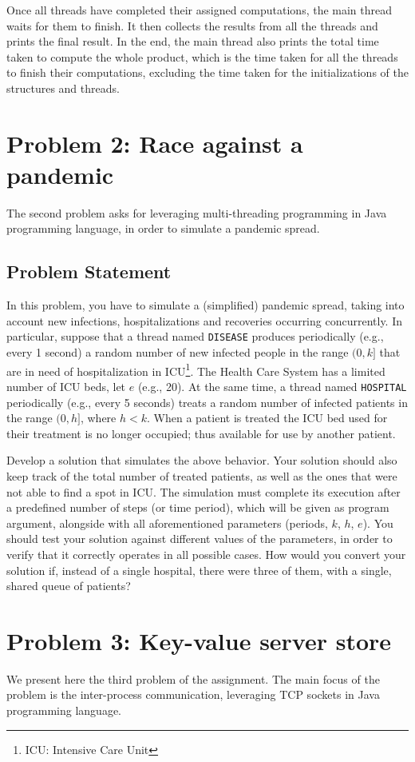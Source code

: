 \documentclass[acmlarge]{acmart}
\newcommand{\disease}{{\small \texttt{DISEASE}} }
\newcommand{\hospital}{{\small \texttt{HOSPITAL}} }
\begin{document}
Once all threads have completed their assigned computations, the main thread waits for them to finish. It then collects the results from all the threads and prints the final result. In the end, the main thread also prints the total time taken to compute the whole product, which is the time taken for all the threads to finish their computations, excluding the time taken for the initializations of the structures and threads.


\section{Problem 2: Race against a pandemic}
\label{section:problem2}
The second problem asks for leveraging multi-threading programming in Java programming language, in order to simulate a pandemic spread.
\subsection{Problem Statement}
In this problem, you have to simulate a (simplified) pandemic spread, taking into account new infections, hospitalizations and recoveries occurring concurrently. In particular, suppose that a thread named \disease produces periodically (e.g., every 1 second) a random number of new infected people in the range $(0, k]$ that are in need of hospitalization in ICU\footnote{ICU: Intensive Care Unit}. The Health Care System has a limited number of ICU beds, let $e$ (e.g., 20). At the same time, a thread named \hospital periodically (e.g., every 5 seconds) treats a random number of infected patients in the range $(0, h]$, where $h<k$. When a patient is treated the ICU bed used for their treatment is no longer occupied; thus available for use by another patient.

Develop a solution that simulates the above behavior. Your solution should also keep track of the total number of treated patients, as well as the ones that were not able to find a spot in ICU. The simulation must complete its execution after a predefined number of steps (or time period), which will be given as program argument, alongside with all aforementioned parameters (periods, $k$, $h$, $e$). You should test your solution against different values of the parameters, in order to verify that it correctly operates in all possible cases. How would you convert your solution if, instead of a single hospital, there were three of them, with a single, shared queue of patients?

\section{Problem 3: Key-value server store}
\label{section:problem3}
We present here the third problem of the assignment. The main focus of the problem is the inter-process communication, leveraging TCP sockets in Java programming language.
\end{document}
